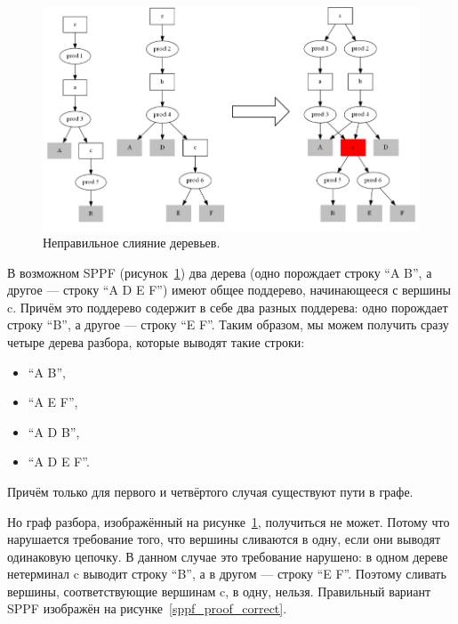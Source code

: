 \begin{figure}[t]
\centering
\includegraphics[width=\linewidth]{Ivanov/Pictures/proof_incorrect_merge.png}
\caption{Неправильное слияние деревьев.}
\label{sppf_proof_incorrect}
\end{figure}

В возможном SPPF (рисунок~\ref{sppf_proof_incorrect}) два дерева (одно порождает строку ``A B'', а другое --- строку ``A D E F'') имеют общее поддерево, начинающееся с вершины c. Причём это поддерево содержит в себе два разных поддерева: одно порождает строку ``B'', а другое --- строку ``E F''. Таким образом, мы можем получить сразу четыре дерева разбора, которые выводят такие строки:
\begin{itemize}
\item ``A B'',
\item ``A E F'',
\item ``A D B'',
\item ``A D E F''.
\end{itemize}

Причём только для первого и четвёртого случая существуют пути в графе. 

Но граф разбора, изображённый на рисунке~\ref{sppf_proof_incorrect}, получиться не может. Потому что нарушается требование того, что вершины сливаются в одну, если они выводят одинаковую цепочку. В данном случае это требование нарушено: в одном дереве нетерминал c выводит строку ``B'', а в другом --- строку ``E F''. Поэтому сливать вершины, соответствующие вершинам c, в одну, нельзя. Правильный вариант SPPF изображён на рисунке~\ref{sppf_proof_correct}.

